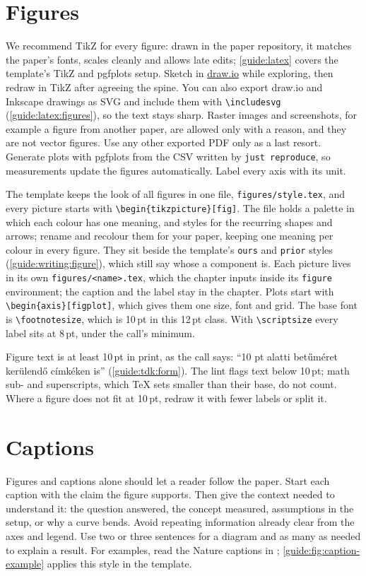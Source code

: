 \section{Figures}\label{guide:writing:figures}
We recommend TikZ for every figure: drawn in the paper repository, it matches the paper's fonts, scales cleanly and allows late edits; \cref{guide:latex} covers the template's TikZ and pgfplots setup. Sketch in \href{https://www.drawio.com/}{draw.io} while exploring, then redraw in TikZ after agreeing the spine. You can also export draw.io and Inkscape drawings as SVG and include them with \texttt{\textbackslash includesvg} (\cref{guide:latex:figures}), so the text stays sharp. Raster images and screenshots, for example a figure from another paper, are allowed only with a reason, and they are not vector figures. Use any other exported PDF only as a last resort. Generate plots with pgfplots from the CSV written by \texttt{just reproduce}, so measurements update the figures automatically. Label every axis with its unit.

The template keeps the look of all figures in one file, \texttt{figures/style.tex}, and every picture starts with \verb|\begin{tikzpicture}[fig]|. The file holds a palette in which each colour has one meaning, and styles for the recurring shapes and arrows; rename and recolour them for your paper, keeping one meaning per colour in every figure. They sit beside the template's \texttt{ours} and \texttt{prior} styles (\cref{guide:writing:figure}), which still say whose a component is. Each picture lives in its own \texttt{figures/<name>.tex}, which the chapter inputs inside its \texttt{figure} environment; the caption and the label stay in the chapter. Plots start with \verb|\begin{axis}[figplot]|, which gives them one size, font and grid. The base font is \texttt{\textbackslash footnotesize}, which is 10\,pt in this 12\,pt class. With \texttt{\textbackslash scriptsize} every label sits at 8\,pt, under the call's minimum.

Figure text is at least 10\,pt in print, as the call says: \enquote{10 pt alatti betűméret kerülendő címkéken is} (\cref{guide:tdk:form}). The lint flags text below 10\,pt; math sub- and superscripts, which \TeX{} sets smaller than their base, do not count. Where a figure does not fit at 10\,pt, redraw it with fewer labels or split it.

\section{Captions}\label{guide:writing:captions}
Figures and captions alone should let a reader follow the paper. Start each caption with the claim the figure supports. Then give the context needed to understand it: the question answered, the concept measured, assumptions in the setup, or why a curve bends. Avoid repeating information already clear from the axes and legend. Use two or three sentences for a diagram and as many as needed to explain a result. For examples, read the Nature captions in \citet{guide:gulyas2015navigable}; \cref{guide:fig:caption-example} applies this style in the template.

